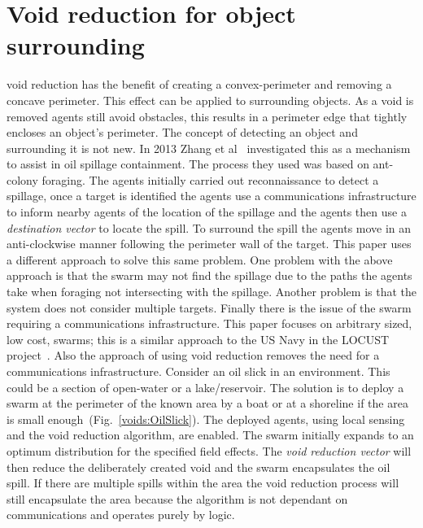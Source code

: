 \documentclass[preprint,12pt]{elsarticle}
\begin{document}
\section{Void reduction for object surrounding}\label{voids:ObjectSurrounding}
void reduction has the benefit of creating a convex-perimeter and removing a concave perimeter. This effect can be applied to surrounding objects. As a void is removed agents still avoid obstacles, this results in a perimeter edge that tightly encloses an object's perimeter. The concept of detecting an object and surrounding it is not new. In 2013 Zhang et al~\cite{ZFG:13} investigated this as a mechanism to assist in oil spillage containment. The process they used was based on ant-colony foraging. The agents initially carried out reconnaissance to detect a spillage, once a target is identified the agents use a communications infrastructure to inform nearby agents of the location of the spillage and the agents then use a \textit{destination vector} to locate the spill. To surround the spill the agents move in an anti-clockwise manner following the perimeter wall of the target. This paper uses a different approach to solve this same problem.
One problem with the above approach is that the swarm may not find the spillage due to the paths the agents take when foraging not intersecting with the spillage. Another problem is that the system does not consider multiple targets. Finally there is the issue of the swarm requiring a communications infrastructure. 
This paper focuses on arbitrary sized, low cost, swarms; this is a similar approach to the US Navy in the LOCUST project~\cite{MW:15, DS:15}. Also the approach of using void reduction removes the need for a communications infrastructure. 
Consider an oil slick in an environment. This could be a section of open-water or a lake/reservoir. The solution is to deploy a swarm at the perimeter of the known area by a boat or at a shoreline if the area is small enough~(Fig.~\ref{voids:OilSlick}). The deployed agents, using local sensing and the void reduction algorithm, are enabled. The swarm initially expands to an optimum distribution for the specified field effects. The \textit{void reduction vector} will then reduce the deliberately created void and the swarm encapsulates the oil spill. If there are multiple spills within the area the void reduction process will still encapsulate the area because the algorithm is not dependant on communications and operates purely by logic.  
\end{document}
